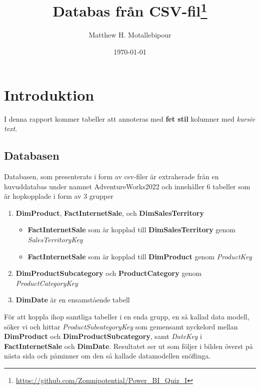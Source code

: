 \documentclass[10pt]{article}
\begin{document}

\title{Databas från CSV-fil\footnote{\footnotesize{\href{https://github.com/Zomnipotential/Power\_BI\_Quiz_I}{https://github.com/Zomnipotential/Power\_BI\_Quiz\_I}}}}
\author{Matthew H. Motallebipour}
\date{\today}
\maketitle

\section{Introduktion}

I denna rapport kommer tabeller att annoteras med \textbf{fet stil} kolumner med \emph{kursiv text}.

\subsection{Databasen}

Databasen, som presenterats i form av csv-filer är extraherade från en huvuddatabas under namnet AdventureWorks2022 och innehåller 6 tabeller som är hopkopplade i form av 3 grupper
\begin{enumerate}
	\item \textbf{DimProduct}, \textbf{FactInternetSale}, och \textbf{DimSalesTerritory}
		\begin{itemize}
			\item \textbf{FactInternetSale} som är kopplad till \textbf{DimSalesTerritory} genom \emph{SalesTerritoryKey}
			\item \textbf{FactInternetSale} som är kopplad till \textbf{DimProduct} genom \emph{ProductKey}
		\end{itemize}
	\item \textbf{DimProductSubcategory} och \textbf{ProductCategory} genom \emph{ProductCategoryKey}
	\item \textbf{DimDate} är en ensamstående tabell
\end{enumerate}

För att koppla ihop samtliga tabeller i en enda grupp, en så kallad data modell, söker vi och hittar \emph{ProductSubcategoryKey} som gemensamt nyckelord mellan \textbf{DimProduct} och \textbf{DimProductSubcategory}, samt \emph{DateKey} i \textbf{FactInternetSale} och \textbf{DimDate}. Resultatet ser ut som följer i bilden överst på nästa sida och påminner om den så kallade datamodellen snöflinga.
\end{document}
